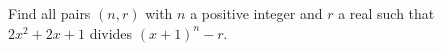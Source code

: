 Find all pairs $(n,r)$ with $n$ a positive integer and $r$ a real such that $2x^2+2x+1$ divides $(x+1)^n - r$.